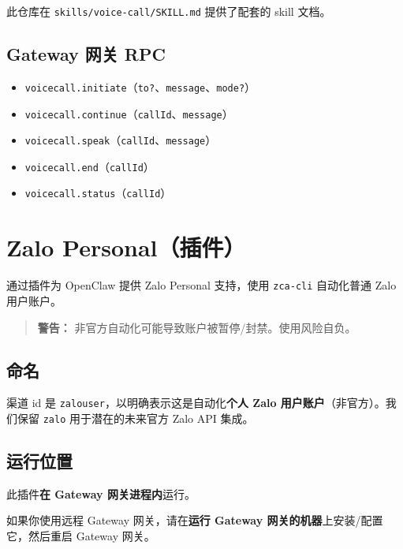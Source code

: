 此仓库在 \texttt{skills/voice-call/SKILL.md} 提供了配套的 skill 文档。

\subsection{Gateway 网关 RPC}


\begin{itemize}
  \item \texttt{voicecall.initiate}（\texttt{to?}、\texttt{message}、\texttt{mode?}）
  \item \texttt{voicecall.continue}（\texttt{callId}、\texttt{message}）
  \item \texttt{voicecall.speak}（\texttt{callId}、\texttt{message}）
  \item \texttt{voicecall.end}（\texttt{callId}）
  \item \texttt{voicecall.status}（\texttt{callId}）
\end{itemize}



\clearpage

\section{Zalo Personal（插件）}


通过插件为 OpenClaw 提供 Zalo Personal 支持，使用 \texttt{zca-cli} 自动化普通 Zalo 用户账户。

\begin{quote}
\textbf{警告：} 非官方自动化可能导致账户被暂停/封禁。使用风险自负。
\end{quote}


\subsection{命名}


渠道 id 是 \texttt{zalouser}，以明确表示这是自动化\textbf{个人 Zalo 用户账户}（非官方）。我们保留 \texttt{zalo} 用于潜在的未来官方 Zalo API 集成。

\subsection{运行位置}


此插件\textbf{在 Gateway 网关进程内}运行。

如果你使用远程 Gateway 网关，请在\textbf{运行 Gateway 网关的机器}上安装/配置它，然后重启 Gateway 网关。

